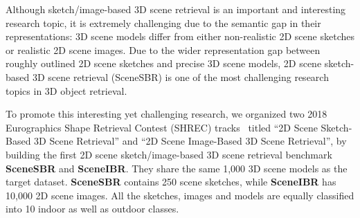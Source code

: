 \documentclass[times, 10pt,twocolumn]{article}
\begin{document}




Although sketch/image-based 3D scene retrieval is an important and interesting research topic, it is extremely challenging due to the semantic gap in their representations: 3D scene models  differ from either non-realistic 2D scene sketches or realistic 2D scene images. Due to the wider representation gap between roughly outlined 2D scene sketches and precise 3D scene models, 2D scene sketch-based 3D scene retrieval (SceneSBR) is one of the most challenging research topics in 3D object retrieval. 

To promote this interesting yet challenging research, we organized two 2018 Eurographics Shape Retrieval Contest (SHREC) tracks~\cite{DBLP:conf/3dor/YuanLL18,  DBLP:conf/3dor/AbdulJLL18, SHREC18-SceneSBR-Track, SHREC18-SceneIBR-Track} titled ``2D Scene Sketch-Based 3D Scene Retrieval'' and ``2D Scene Image-Based 3D Scene Retrieval'',  by building the first 2D scene sketch/image-based 3D scene retrieval benchmark \textbf{SceneSBR} and \textbf{SceneIBR}. They share the same 1,000 3D scene models as the target dataset. \textbf{SceneSBR} contains 250 scene sketches, while \textbf{SceneIBR} has 10,000 2D scene images. All the sketches, images and models are equally classified into 10 indoor as well as outdoor classes. 
\end{document}
